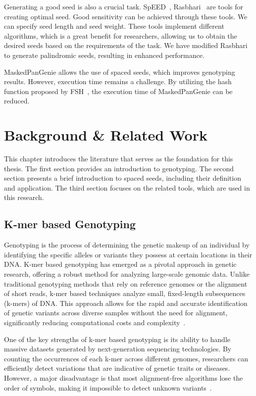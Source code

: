 \documentclass[PhD]{PHlab-thesis}
\begin{document}
Generating a good seed is also a crucial task. SpEED~\cite{SpEED}, Rasbhari~\cite{Rasbhari} are tools for creating optimal seed. Good sensitivity can be achieved through these tools. We can specify seed length and seed weight. These tools implement different algorithms, which is a great benefit for researchers, allowing us to obtain the desired seeds based on the requirements of the task. We have modified Rasbhari to generate palindromic seeds, resulting in enhanced performance.

MaskedPanGenie allows the use of spaced seeds, which improves genotyping results. However, execution time remains a challenge. By utilizing the hash function proposed by FSH~\cite{FSH}, the execution time of MaskedPanGenie can be reduced.



\chapter{Background \& Related Work}
This chapter introduces the literature that serves as the foundation for this thesis. The first section provides an introduction to genotyping. The second section presents a brief introduction to spaced seeds, including their definition and application. The third section focuses on the related tools, which are used in this research.

\section{K-mer based Genotyping}
Genotyping is the process of determining the genetic makeup of an individual by identifying the specific alleles or variants they possess at certain locations in their DNA. K-mer based genotyping has emerged as a pivotal approach in genetic research, offering a robust method for analyzing large-scale genomic data. Unlike traditional genotyping methods that rely on reference genomes or the alignment of short reads, k-mer based techniques analyze small, fixed-length subsequences (k-mers) of DNA. This approach allows for the rapid and accurate identification of genetic variants across diverse samples without the need for alignment, significantly reducing computational costs and complexity~\cite{surveyK-mer}.

One of the key strengths of k-mer based genotyping is its ability to handle massive datasets generated by next-generation sequencing technologies. By counting the occurrences of each k-mer across different genomes, researchers can efficiently detect variations that are indicative of genetic traits or diseases. However, a major disadvantage is that most alignment-free algorithms lose the order of symbols, making it impossible to detect unknown variants~\cite{Alignment-freeKmers}.
\end{document}
